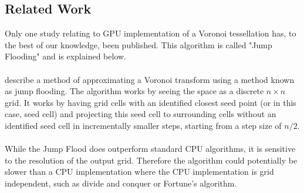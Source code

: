 \subsection{Related Work}\label{gpu:sec:rel}
Only one study relating to GPU implementation of a Voronoi tessellation has, to the best of our knowledge, been published. This algorithm is called "Jump Flooding" and is explained below.
\\
\\
\citet{rong2006jump} describe a method of approximating a Voronoi transform using a method known as jump flooding. The algorithm works by seeing the space as a discrete $n \times n$ grid. It works by having grid cells with an identified closest seed point (or in this case, seed cell) and projecting this seed cell to surrounding cells without an identified seed cell in incrementally smaller steps, starting from a step size of $n/2$.
\\
\\
While the Jump Flood does outperform standard CPU algorithms, it is sensitive to the resolution of the output grid. Therefore the algorithm could potentially be slower than a CPU implementation where the CPU implementation is grid independent, such as divide and conquer or Fortune's algorithm.
